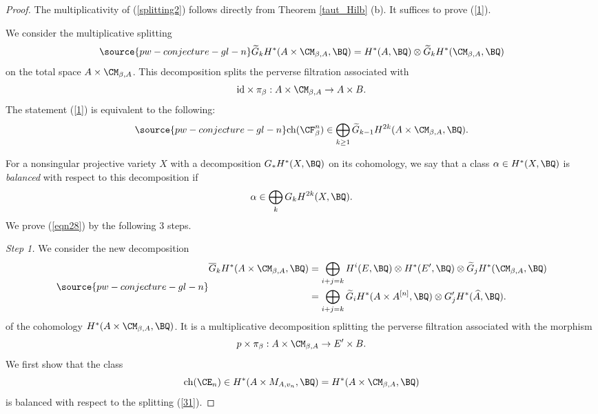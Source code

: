 \begin{proof}
The multiplicativity of (\ref{splitting2}) follows directly from Theorem \ref{taut_Hilb} (b). It suffices to prove (\ref{1}).

We consider the multiplicative splitting
\begin{equation}\label{eqn27}
\source{pw-conjecture-gl-n}
\widetilde{G}_kH^\ast(A \times \CM_{\beta,A} ,\BQ) = H^\ast(A, \BQ) \otimes \widetilde{G}_kH^\ast(\CM_{\beta,A}, \BQ)
\end{equation}
on the total space $A \times \CM_{\beta,A}$. This decomposition splits the perverse filtration associated with
\[
\mathrm{id}\times \pi_\beta: A \times \CM_{\beta, A} \to A \times B.
\]
The statement (\ref{1}) is equivalent to the following:
\begin{equation}\label{eqn28}
\source{pw-conjecture-gl-n}
\mathrm{ch}(\CF^n_\beta) \in \bigoplus_{k\geq 1} \widetilde{G}_{k-1} H^{2k}(A\times \CM_{\beta, A}, \BQ).
\end{equation}

For a nonsingular projective variety $X$ with a decomposition $G_*H^*(X, \BQ)$ on its cohomology, we say that a class $\alpha \in H^*(X, \BQ)$ is \emph{balanced} with respect to this decomposition if
\[
\alpha \in \bigoplus_{k} G_{k} H^{2k}(X, \BQ).
\]
We prove (\ref{eqn28}) by the following 3 steps.

\emph{Step 1.} We consider the new decomposition
\begin{equation}\label{31}
\source{pw-conjecture-gl-n}
\begin{split}
\overline{G}_k H^*(A \times \CM_{\beta, A}, \BQ)& = \bigoplus_{i+j=k} H^i(E, \BQ) \otimes H^*(E', \BQ) \otimes \widetilde{G}_jH^*(\CM_{\beta,A}, \BQ)\\
& = \bigoplus_{i+j=k} \widetilde{G}_i H^\ast(A \times A^{[n]}, \BQ) \otimes G'_jH^\ast(\widehat{A}, \BQ).
\end{split}
\end{equation}
of the cohomology $H^\ast(A\times \CM_{\beta,A}, \BQ)$. It is a multiplicative decomposition splitting the perverse filtration associated with the morphism
\[
p \times \pi_\beta: A\times \CM_{\beta,A} \to E' \times B.
\]
We first show that the class
\[
\mathrm{ch}(\CE_n) \in H^\ast(A \times M_{A, v_n}, \BQ) = H^*(A \times \CM_{\beta,A}, \BQ)
\]
is balanced with respect to the splitting (\ref{31}).



\end{proof}
